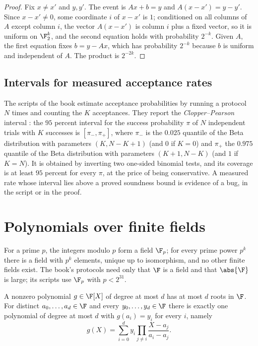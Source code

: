 \begin{refsection}
\begin{proof}
Fix $x\ne x'$ and $y,y'$. The event is $Ax+b=y$ and $A(x-x')=y-y'$. Since $x-x'\ne0$, some coordinate $i$ of $x-x'$ is $1$; conditioned on all columns of $A$ except column $i$, the vector $A(x-x')$ is column $i$ plus a fixed vector, so it is uniform on $\F_2^k$, and the second equation holds with probability $2^{-k}$. Given $A$, the first equation fixes $b=y-Ax$, which has probability $2^{-k}$ because $b$ is uniform and independent of $A$. The product is $2^{-2k}$.
\end{proof}

\subsection{Intervals for measured acceptance rates}\label{sec:toolkit:intervals}

The scripts of the book estimate acceptance probabilities by running a protocol $N$ times and counting the $K$ acceptances. They report the \emph{Clopper--Pearson} interval \parencite{ClopperPearson1934}: the $95$ percent interval for the success probability $\pi$ of $N$ independent trials with $K$ successes is $[\pi_-,\pi_+]$, where $\pi_-$ is the $0.025$ quantile of the Beta distribution with parameters $(K,N-K+1)$ (and $0$ if $K=0$) and $\pi_+$ the $0.975$ quantile of the Beta distribution with parameters $(K+1,N-K)$ (and $1$ if $K=N$). It is obtained by inverting two one-sided binomial tests, and its coverage is at least $95$ percent for every $\pi$, at the price of being conservative. A measured rate whose interval lies above a proved soundness bound is evidence of a bug, in the script or in the proof.

\section{Polynomials over finite fields}\label{sec:toolkit:polynomials}

For a prime $p$, the integers modulo $p$ form a field $\F_p$; for every prime power $p^k$ there is a field with $p^k$ elements, unique up to isomorphism, and no other finite fields exist. The book's protocols need only that $\F$ is a field and that $\abs{\F}$ is large; its scripts use $\F_p$ with $p<2^{31}$.

\begin{lemma}\label{lem:toolkit:lagrange}
A nonzero polynomial $g\in\F[X]$ of degree at most $d$ has at most $d$ roots in $\F$. For distinct $a_0,\dots,a_d\in\F$ and every $y_0,\dots,y_d\in\F$ there is exactly one polynomial of degree at most $d$ with $g(a_i)=y_i$ for every $i$, namely
\[
g(X)=\sum_{i=0}^dy_i\prod_{j\ne i}\frac{X-a_j}{a_i-a_j}.
\]
\end{lemma}


\end{refsection}
